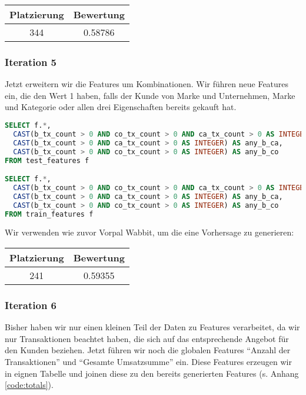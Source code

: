 \begin{tabular}{|c|c|}
	\hline \textbf{Platzierung} & \textbf{Bewertung} \\ 
	\hline 344 & 0.58786  \\ 
	\hline 
\end{tabular}

\subsubsection{Iteration 5}

Jetzt erweitern wir die Features um Kombinationen. Wir führen neue Features ein, die den Wert 1 haben,
falls der Kunde von Marke und Unternehmen, Marke und Kategorie oder allen drei Eigenschaften bereits
gekauft hat.

\begin{lstlisting}[language=SQL]
SELECT f.*, 
  CAST(b_tx_count > 0 AND co_tx_count > 0 AND ca_tx_count > 0 AS INTEGER) AS any_b_co_ca,
  CAST(b_tx_count > 0 AND ca_tx_count > 0 AS INTEGER) AS any_b_ca,
  CAST(b_tx_count > 0 AND co_tx_count > 0 AS INTEGER) AS any_b_co
FROM test_features f

SELECT f.*, 
  CAST(b_tx_count > 0 AND co_tx_count > 0 AND ca_tx_count > 0 AS INTEGER) AS any_b_co_ca,
  CAST(b_tx_count > 0 AND ca_tx_count > 0 AS INTEGER) AS any_b_ca,
  CAST(b_tx_count > 0 AND co_tx_count > 0 AS INTEGER) AS any_b_co
FROM train_features f
\end{lstlisting}

Wir verwenden wie zuvor Vorpal Wabbit, um die eine Vorhersage zu generieren:

\begin{tabular}{|c|c|}
	\hline \textbf{Platzierung} & \textbf{Bewertung} \\ 
	\hline 241 & 0.59355  \\ 
	\hline 
\end{tabular}

\subsubsection{Iteration 6}
Bisher haben wir nur einen kleinen Teil der Daten zu Features verarbeitet, da wir nur Transaktionen
beachtet haben, die sich auf das entsprechende Angebot für den Kunden beziehen. Jetzt führen wir noch
die globalen Features "`Anzahl der Transaktionen"' und "`Gesamte Umsatzsumme"' ein. Diese Features
erzeugen wir in eignen Tabelle und joinen diese zu den bereits generierten Features (s. Anhang \ref{code:totals}).

